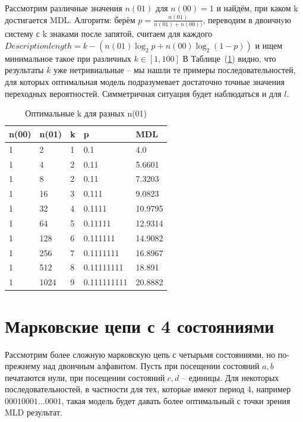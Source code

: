 \documentclass[12pt]{article}
\begin{document}
	Рассмотрим различные значения $n(01)$ для $n(00)=1$ и найдём, при каком k достигается MDL. Алгоритм: берём $p = \frac{n(01)}{n(01)+n(00))}$, переводим в двоичнyю систему с k знаками после запятой, считаем для каждого $Description length = k - (n(01)\log_2{p}+n(00)\log_2{(1-p)})$ и ищем минимальное такое при различных $k\in[1,100]$ В Таблице~(\ref{table:n00n01}) видно, что результаты $k$ уже нетривиальные -- мы нашли те примеры последовательностей, для которых оптимальная модель подразумевает достаточно точные значения переходных вероятностей. Симметричная ситуация будет наблюдаться и для $l$.
	
	\begin{table}[!h]
		\caption{Оптимальные k для разных n(01)}
		\label{table:n00n01}
		\begin{center}
			\begin{tabular}{|l|l|l|l|l|}
				\hline
				n(00) & n(01) & k & p & MDL \\
				\hline
				1 & 2 & 1 & 0.1 & 4.0 \\ 
				\hline 
				1 & 4 & 2 & 0.11 & 5.6601 \\ 
				\hline 
				1 & 8 & 2 & 0.11 & 7.3203 \\ 
				\hline 
				1 & 16 & 3 & 0.111 & 9.0823 \\ 
				\hline 
				1 & 32 & 4 & 0.1111 & 10.9795 \\ 
				\hline 
				1 & 64 & 5 & 0.11111 & 12.9314 \\ 
				\hline 
				1 & 128 & 6 & 0.111111 & 14.9082 \\ 
				\hline 
				1 & 256 & 7 & 0.1111111 & 16.8967 \\ 
				\hline 
				1 & 512 & 8 & 0.11111111 & 18.891 \\ 
				\hline 
				1 & 1024 & 9 & 0.111111111 & 20.8882 \\ 
				\hline 
			\end{tabular}
		\end{center}
	\end{table}

	\section*{Марковские цепи с 4 состояниями}
	Рассмотрим более сложную марковскую цепь с четырьмя состояниями, но по-прежнему над двоичным алфавитом. Пусть при посещении состояний $a, b$ печатаются нули, при посещении состояний $c, d$ -- единицы. Для некоторых последовательностей, в частности для тех, которые имеют период 4, например $00010001\dots0001$, такая модель будет давать более оптимальный с точки зрения MLD результат.
		
\end{document}
